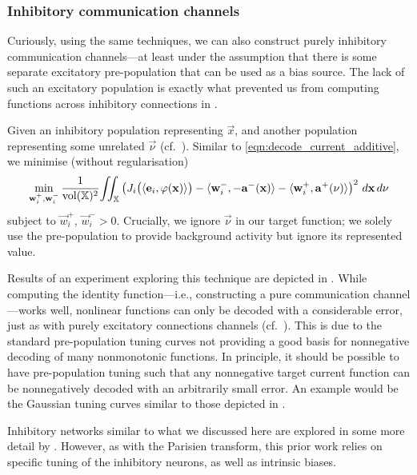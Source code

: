 \subsubsection{Inhibitory communication channels}
Curiously, using the same techniques, we can also construct purely inhibitory communication channels---at least under the assumption that there is some separate excitatory pre-population that can be used as a bias source.
The lack of such an excitatory population is exactly what prevented us from computing functions across inhibitory connections in .

Given an inhibitory population representing $\vec x$, and another population representing some unrelated $\vec \nu$ (cf.~).
Similar to \cref{eqn:decode_current_additive}, we minimise (without regularisation)
\begin{align}
	\min_{\vec w_i^+, \vec w_i^-}
	\frac{1}{\vol(\Xrepr)^2} \! \iint_{\Xrepr}
	\left(
		J_i\bigl(\langle \vec e_i, \phi(\vec x) \rangle\bigr)
		- \langle \vec w^-_i, -\vec a^-(\vec x) \rangle
		- \langle \vec w^+_i, \vec a^+(\vec \nu) \rangle
	\right)^2 \, d\vec x \, d\vec \nu %
	\label{eqn:inhibitory_communication_channel}
\end{align}
subject to $\vec w_{i}^+$, $\vec w_{i}^- > 0$.
Crucially, we ignore $\vec \nu$ in our target function; we solely use the pre-population to provide background activity but ignore its represented value.

Results of an experiment exploring this technique are depicted in .
While computing the identity function---i.e., constructing a pure communication channel---works well, nonlinear functions can only be decoded with a considerable error, just as with purely excitatory connections channels (cf.~).
This is due to the standard \NEF pre-population tuning curves not providing a good basis for nonnegative decoding of many nonmonotonic functions.
In principle, it should be possible to have pre-population tuning such that any nonnegative target current function can be nonnegatively decoded with an arbitrarily small error.
An example would be the Gaussian tuning curves similar to those depicted in .

Inhibitory networks similar to what we discussed here are explored in some more detail by \citet{tripp2016function}.
However, as with the Parisien transform, this prior work relies on specific tuning of the inhibitory neurons, as well as intrinsic biases.

